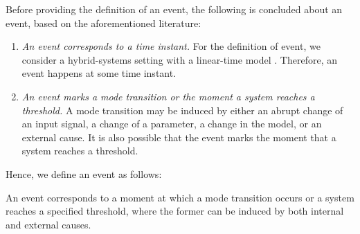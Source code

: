 Before providing the definition of an event, the following is concluded about an event, based on the aforementioned literature:

\begin{enumerate}
	\item\textit{An event corresponds to a time instant.}
	\cstart For the definition of event, we consider a hybrid-systems setting with a linear-time model \autocite{alur1994theory}. Therefore, an event happens at some time instant.\cend
	
	\item\textit{An event marks a mode transition or the moment a system reaches a threshold.} A mode transition may be \cstart induced \cend by either an abrupt change of an input signal, a change of a parameter, a change in the model, \cstart or an external cause. \cend It is also possible that the event marks the moment that a system reaches a threshold.
	
\end{enumerate}

Hence, we define an event as follows:
\begin{definition}[Event] \label{def:event}
	\cstart An event corresponds to a moment at which a mode transition occurs or a system reaches a specified threshold, where the former can be induced by both internal and external causes. \cend 
\end{definition}


